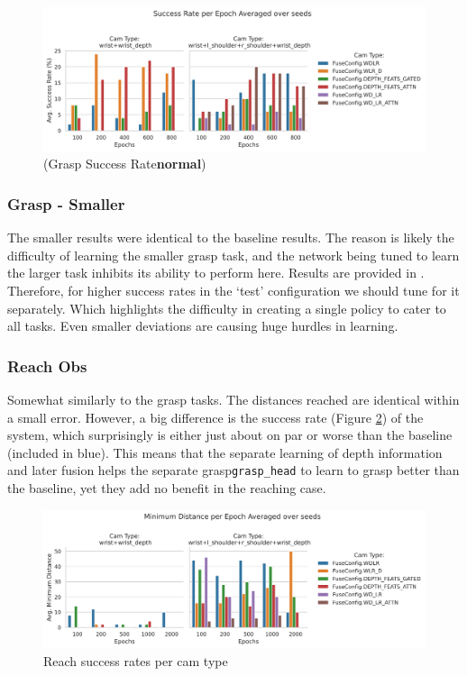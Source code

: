 \begin{figure}[H]
  \centering
  \includegraphics[width=\linewidth]{assets/evaluation/sep-dep/grasp-normal-success-cams.png}
  \caption{(Grasp Success Rate\textbf{normal})}\label{fig:sepdep-normal-success}
\end{figure}

\subsubsection{Grasp - Smaller}
The smaller results were identical to the baseline results. The reason is likely the difficulty of learning the smaller grasp task, and the network being tuned to learn the larger task inhibits its ability to perform here. Results are provided in . Therefore, for higher success rates in the `test' configuration we should tune for it separately. Which highlights the difficulty in creating a single policy to cater to all tasks. Even smaller deviations are causing huge hurdles in learning.

\subsubsection{Reach Obs}
Somewhat similarly to the grasp tasks. The distances reached are identical within a small error.  However, a big difference is the success rate (Figure \ref{fig:sep-dep-reach-success}) of the system, which surprisingly is either just about on par or worse than the baseline (included in blue). This means that the separate learning of depth information and later fusion helps the separate grasp\verb|grasp_head| to learn to grasp better than the baseline, yet they add no benefit in the reaching case.

\begin{figure}[H]
  \centering
  \includegraphics[width=\linewidth]{assets/evaluation/sep-dep/reach-success-cams-epochs.png}
  \caption{Reach success rates per cam type}\label{fig:sep-dep-reach-success}
\end{figure}
